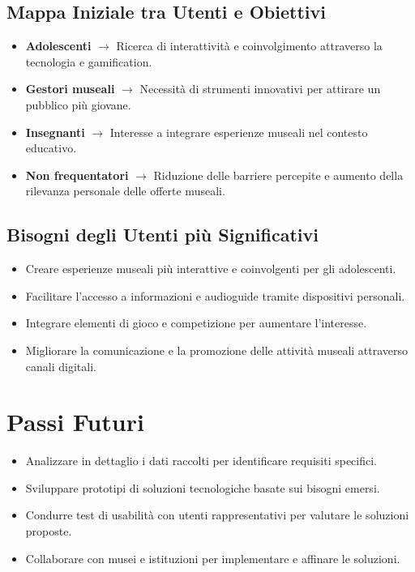 \documentclass{article}
\begin{document}
\subsection{Mappa Iniziale tra Utenti e Obiettivi}

\begin{itemize}
    \item \textbf{Adolescenti} $\rightarrow$ Ricerca di interattività e coinvolgimento attraverso la tecnologia e gamification.
    \item \textbf{Gestori museali} $\rightarrow$ Necessità di strumenti innovativi per attirare un pubblico più giovane.
    \item \textbf{Insegnanti} $\rightarrow$ Interesse a integrare esperienze museali nel contesto educativo.
    \item \textbf{Non frequentatori} $\rightarrow$ Riduzione delle barriere percepite e aumento della rilevanza personale delle offerte museali.
\end{itemize}

\subsection{Bisogni degli Utenti più Significativi}

\begin{itemize}
    \item Creare esperienze museali più interattive e coinvolgenti per gli adolescenti.
    \item Facilitare l'accesso a informazioni e audioguide tramite dispositivi personali.
    \item Integrare elementi di gioco e competizione per aumentare l'interesse.
    \item Migliorare la comunicazione e la promozione delle attività museali attraverso canali digitali.
\end{itemize}

\section{Passi Futuri}

\begin{itemize}
    \item Analizzare in dettaglio i dati raccolti per identificare requisiti specifici.
    \item Sviluppare prototipi di soluzioni tecnologiche basate sui bisogni emersi.
    \item Condurre test di usabilità con utenti rappresentativi per valutare le soluzioni proposte.
    \item Collaborare con musei e istituzioni per implementare e affinare le soluzioni.
\end{itemize}
\end{document}
